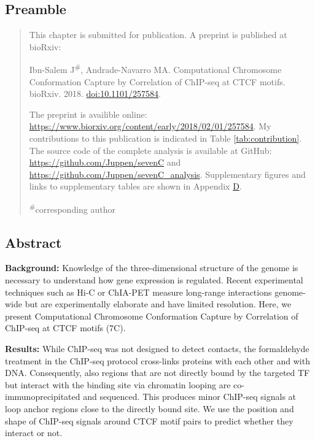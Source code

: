 \documentclass[a4paper,twoside=true,openright,parskip=full,chapterprefix=true,11pt,headings=normal,bibliography=totoc,listof=totoc,titlepage=on,captions=tableabove,draft=false]{scrreprt}
\theoremstyle{definition}
\theoremstyle{definition}
\theoremstyle{definition}
\theoremstyle{remark}
\begin{document}
\hypertarget{preamble-3}{%
\subsection*{Preamble}\label{preamble-3}}

\begin{quote}
This chapter is submitted for publication. A preprint is published at
bioRxiv:

Ibn-Salem J\textsuperscript{\#}, Andrade-Navarro MA. Computational
Chromosome Conformation Capture by Correlation of ChIP-seq at CTCF
motifs. bioRxiv. 2018.
\href{https://doi.org/10.1101/257584}{doi:10.1101/257584}.

The preprint is availible online:
\url{https://www.biorxiv.org/content/early/2018/02/01/257584}. My
contributions to this publication is indicated in Table
\ref{tab:contribution}. The source code of the complete analysis is
available at GitHub: \url{https://github.com/Juppen/sevenC} and
\url{https://github.com/Juppen/sevenC_analysis}. Supplementary figures
and links to supplementary tables are shown in Appendix
\protect\hyperlink{loop-support}{D}.

\textsuperscript{\#}corresponding author
\end{quote}

\hypertarget{abstract-4}{%
\subsection*{Abstract}\label{abstract-4}}

\textbf{Background:} Knowledge of the three-dimensional structure of the
genome is necessary to understand how gene expression is regulated.
Recent experimental techniques such as Hi-C or ChIA-PET measure
long-range interactions genome-wide but are experimentally elaborate and
have limited resolution. Here, we present Computational Chromosome
Conformation Capture by Correlation of ChIP-seq at CTCF motifs (7C).

\textbf{Results:} While ChIP-seq was not designed to detect contacts,
the formaldehyde treatment in the ChIP-seq protocol cross-links proteins
with each other and with DNA. Consequently, also regions that are not
directly bound by the targeted TF but interact with the binding site via
chromatin looping are co-immunoprecipitated and sequenced. This produces
minor ChIP-seq signals at loop anchor regions close to the directly
bound site. We use the position and shape of ChIP-seq signals around
CTCF motif pairs to predict whether they interact or not.
\end{document}
